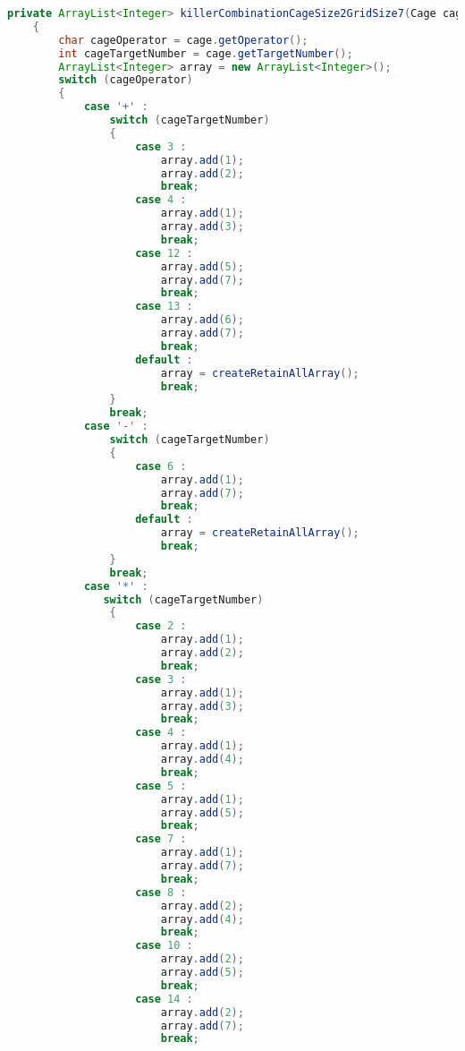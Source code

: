 \begin{lstlisting}[language=Java,basicstyle=\tiny,caption=SolverRuleBased.java]
    private ArrayList<Integer> killerCombinationCageSize2GridSize7(Cage cage)
    {
        char cageOperator = cage.getOperator();
        int cageTargetNumber = cage.getTargetNumber();
        ArrayList<Integer> array = new ArrayList<Integer>();
        switch (cageOperator)
        {
            case '+' :
                switch (cageTargetNumber)
                {
                    case 3 :
                        array.add(1);
                        array.add(2);
                        break;
                    case 4 :  
                        array.add(1);
                        array.add(3);
                        break;
                    case 12 :
                        array.add(5);
                        array.add(7);
                        break;
                    case 13 :
                        array.add(6);
                        array.add(7);
                        break;
                    default :
                        array = createRetainAllArray();
                        break;
                }
                break;
            case '-' :
                switch (cageTargetNumber)
                {
                    case 6 :
                        array.add(1);
                        array.add(7);
                        break;
                    default :
                        array = createRetainAllArray();
                        break;
                }
                break;
            case '*' :
               switch (cageTargetNumber)
                {
                    case 2 :
                        array.add(1);
                        array.add(2);
                        break;
                    case 3 :
                        array.add(1);
                        array.add(3);
                        break;
                    case 4 :
                        array.add(1);
                        array.add(4);
                        break;
                    case 5 :
                        array.add(1);
                        array.add(5);
                        break;
                    case 7 :
                        array.add(1);
                        array.add(7);
                        break;
                    case 8 :
                        array.add(2);
                        array.add(4);
                        break;
                    case 10 :
                        array.add(2);
                        array.add(5);
                        break;
                    case 14 :
                        array.add(2);
                        array.add(7);
                        break;

\end{lstlisting}
